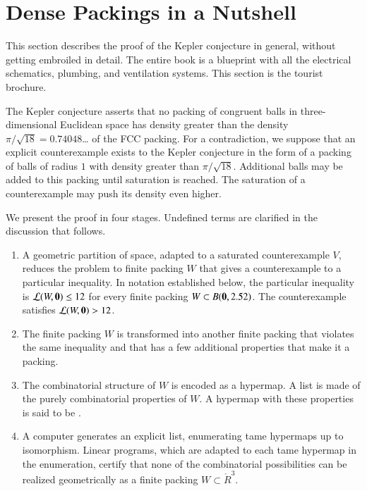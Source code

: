 \section{Dense Packings in a Nutshell}

This section describes the proof of the Kepler conjecture in general,
without
getting embroiled in detail.  The entire book
is a blueprint with all the electrical schematics, plumbing, and
ventilation systems.  This section is the tourist brochure.

The Kepler conjecture asserts that no packing of congruent balls in
three-dimensional Euclidean space has density greater than the density
$\pi/\sqrt{18} = 0.74048$\dots{} of the FCC packing.  For a contradiction, we suppose that an
explicit counterexample exists to the Kepler conjecture in the form of a
packing of balls of radius $1$ with density  greater than
$\pi/\sqrt{18}$.  Additional balls may be added to this packing until
saturation is reached.  The saturation of a counterexample may push its
density even higher.

We present the proof in four stages.  Undefined terms are clarified in the
discussion that follows.

\begin{enumerate}
\item A geometric partition of space, adapted to a saturated
  counterexample $V$, reduces the problem to finite packing $W$ that
  gives a counterexample to a particular inequality.  In notation
  established below, the particular inequality is ${\mathcal L}(W,{\mathbf 0})\le
  12$ for every finite packing $W\subset B({\mathbf 0},2.52)$.  The
  counterexample satisfies ${\mathcal L}(W,{\mathbf 0})>12$.
\item The finite packing $W$ is transformed into another finite packing that violates the same
inequality and that has a few additional properties that make it a  packing.
\item The combinatorial structure of $W$ is encoded as a hypermap.  A list is
  made of the purely combinatorial properties of $W$.  A hypermap with
  these properties is said to be .
\item A computer generates an explicit list, enumerating
  tame hypermaps up to isomorphism.  Linear programs, which are
  adapted to each tame hypermap in the enumeration, certify that
  none of the combinatorial possibilities can be  realized geometrically as a finite packing
  $W\subset \ring{R}^3$.  
\end{enumerate}

